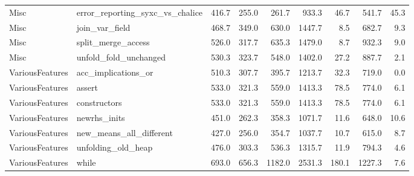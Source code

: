 \begin{sidewaystable}
\begin{tabular}{l l || r r r | r r | r r}
Misc & error_reporting_syxc_vs_chalice & 416.7 & 255.0 & 261.7 & 933.3 & 46.7 & 541.7 & 45.3\\ 
Misc & join_var_field & 468.7 & 349.0 & 630.0 & 1447.7 & 8.5 & 682.7 & 9.3\\ 
Misc & split_merge_access & 526.0 & 317.7 & 635.3 & 1479.0 & 8.7 & 932.3 & 9.0\\ 
Misc & unfold_fold_unchanged & 530.3 & 323.7 & 548.0 & 1402.0 & 27.2 & 887.7 & 2.1\\ 
VariousFeatures & acc_implications_or & 510.3 & 307.7 & 395.7 & 1213.7 & 32.3 & 719.0 & 0.0\\ 
VariousFeatures & assert & 533.0 & 321.3 & 559.0 & 1413.3 & 78.5 & 774.0 & 6.1\\ 
VariousFeatures & constructors & 533.0 & 321.3 & 559.0 & 1413.3 & 78.5 & 774.0 & 6.1\\ 
VariousFeatures & newrhs_inits & 451.0 & 262.3 & 358.3 & 1071.7 & 11.6 & 648.0 & 10.6\\ 
VariousFeatures & new_means_all_different & 427.0 & 256.0 & 354.7 & 1037.7 & 10.7 & 615.0 & 8.7\\ 
VariousFeatures & unfolding_old_heap & 476.0 & 303.3 & 536.3 & 1315.7 & 11.9 & 794.3 & 4.6\\ 
VariousFeatures & while & 693.0 & 656.3 & 1182.0 & 2531.3 & 180.1 & 1227.3 & 7.6\\ 
\end{tabular}
\end{sidewaystable}

\clearpage